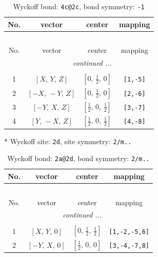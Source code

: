 \documentclass[fleqn,8pt]{jsarticle}
\begin{document}
\begin{longtable}{cccc}
\caption{Wyckoff bond: {\tt 4c@2c}, bond symmetry: {\tt -1}}
 \\
 \hline \hline
No. & vector & center & mapping \\ \hline \endfirsthead

\multicolumn{3}{l}{\tablename\ \thetable{}} \\
 \hline \hline
No. & vector & center & mapping \\ \hline \endhead

 \hline \hline
\multicolumn{3}{r}{\footnotesize\it continued ...} \\ \endfoot

 \hline \hline
\multicolumn{3}{r}{} \\ \endlastfoot

1 & $\left[ X,\, Y,\, Z \right]$ & $\left[ 0,\, \frac{1}{2},\, 0 \right]$ & {\tt [1,-5]} \\ \hline
2 & $\left[ - X,\, - Y,\, Z \right]$ & $\left[ 0,\, \frac{1}{2},\, 0 \right]$ & {\tt [2,-6]} \\ \hline
3 & $\left[ - Y,\, X,\, Z \right]$ & $\left[ \frac{1}{2},\, 0,\, \frac{1}{2} \right]$ & {\tt [3,-7]} \\ \hline
4 & $\left[ Y,\, - X,\, Z \right]$ & $\left[ \frac{1}{2},\, 0,\, \frac{1}{2} \right]$ & {\tt [4,-8]} \\
\end{longtable}
* Wyckoff site: {\tt 2d}, site symmetry: {\tt 2/m..}
\renewcommand{\arraystretch}{1.2}
\begin{longtable}{cccc}
\caption{Wyckoff bond: {\tt 2a@2d}, bond symmetry: {\tt 2/m..}}
 \\
 \hline \hline
No. & vector & center & mapping \\ \hline \endfirsthead

\multicolumn{3}{l}{\tablename\ \thetable{}} \\
 \hline \hline
No. & vector & center & mapping \\ \hline \endhead

 \hline \hline
\multicolumn{3}{r}{\footnotesize\it continued ...} \\ \endfoot

 \hline \hline
\multicolumn{3}{r}{} \\ \endlastfoot

1 & $\left[ X,\, Y,\, 0 \right]$ & $\left[ 0,\, \frac{1}{2},\, \frac{1}{2} \right]$ & {\tt [1,-2,-5,6]} \\ \hline
2 & $\left[ - Y,\, X,\, 0 \right]$ & $\left[ \frac{1}{2},\, 0,\, 0 \right]$ & {\tt [3,-4,-7,8]} \\
\end{longtable}
\end{document}
